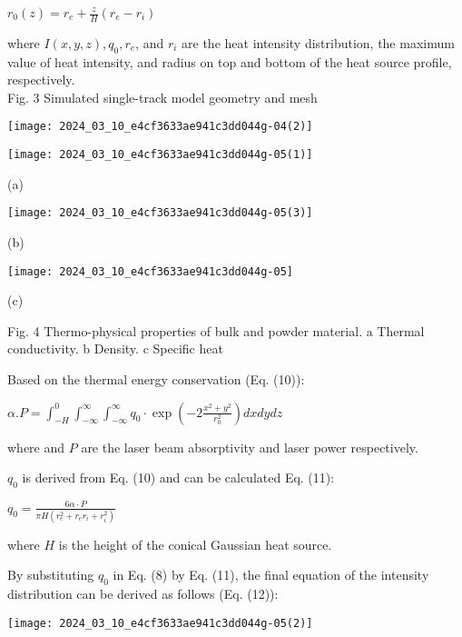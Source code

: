 \documentclass[10pt]{article}
\begin{document}
$r_{0}(z)=r_{e}+\frac{z}{H}\left(r_{e}-r_{i}\right)$

where $I(x, y, z), q_{0}, r_{e}$, and $r_{i}$ are the heat intensity distribution, the maximum value of heat intensity, and radius on top and bottom of the heat source profile, respectively.\\
Fig. 3 Simulated single-track model geometry and mesh

\begin{center}
\texttt{[image: 2024\_03\_10\_e4cf3633ae941c3dd044g-04(2)]}
\end{center}

\begin{center}
\texttt{[image: 2024\_03\_10\_e4cf3633ae941c3dd044g-05(1)]}
\end{center}

(a)

\begin{center}
\texttt{[image: 2024\_03\_10\_e4cf3633ae941c3dd044g-05(3)]}
\end{center}

(b)

\begin{center}
\texttt{[image: 2024\_03\_10\_e4cf3633ae941c3dd044g-05]}
\end{center}

(c)

Fig. 4 Thermo-physical properties of bulk and powder material. a Thermal conductivity. b Density. c Specific heat

Based on the thermal energy conservation (Eq. (10)):

$\alpha . P=\int_{-H}^{0} \int_{-\infty}^{\infty} \int_{-\infty}^{\infty} q_{0} \cdot \exp \left(-2 \frac{x^{2}+y^{2}}{r_{0}^{2}}\right) d x d y d z$

where and $P$ are the laser beam absorptivity and laser power respectively.

$q_{0}$ is derived from Eq. (10) and can be calculated Eq. (11):

$q_{0}=\frac{6 \alpha \cdot P}{\pi H\left(r_{e}^{2}+r_{e} r_{i}+r_{i}^{2}\right)}$

where $H$ is the height of the conical Gaussian heat source.

By substituting $q_{0}$ in Eq. (8) by Eq. (11), the final equation of the intensity distribution can be derived as follows (Eq. (12)):

\begin{center}
\texttt{[image: 2024\_03\_10\_e4cf3633ae941c3dd044g-05(2)]}
\end{center}
\end{document}
